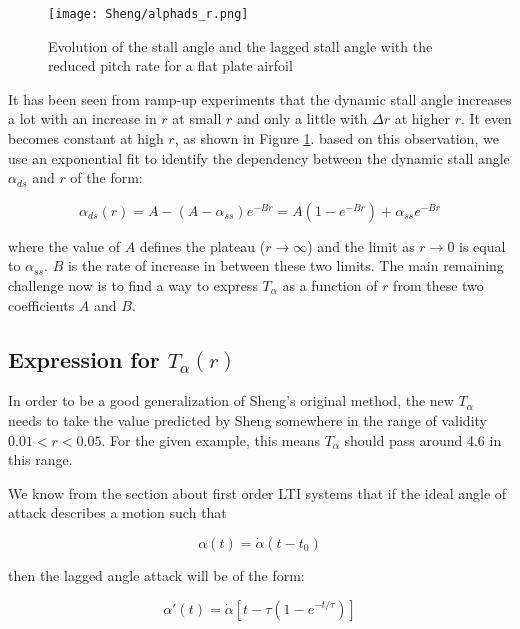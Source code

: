 \documentclass{article}
\newcommand{\alphadot}{\dot{\alpha}}
\begin{document}
\begin{figure}[h]
\centering
\texttt{[image: Sheng/alphads\_r.png]} 
\caption{Evolution of the stall angle and the lagged stall angle with the reduced pitch rate for a flat plate airfoil}
\label{fig:alphads_r}
\end{figure}

It has been seen from ramp-up experiments that the dynamic stall angle increases a lot with an increase in $r$ at small $r$ and only a little with $\Delta r$ at higher $r$. It even becomes constant at high $r$, as shown in Figure \ref{fig:alphads_r}. based on this observation, we use an exponential fit to identify the dependency between the dynamic stall angle $\alpha_{ds}$ and $r$ of the form: 

\begin{equation}
\alpha_{ds}(r) = A-(A-\alpha_{ss})e^{-Br} = A(1-e^{-Br})+\alpha_{ss}e^{-Br}
\label{eq:alpha_ds_r}
\end{equation}

\noindent where the value of $A$ defines the plateau ($r \rightarrow \infty$) and the limit as $r \rightarrow 0$ is equal to $\alpha_{ss}$. $B$ is the rate of increase in between these two limits. The main remaining challenge now is to find a way to express $T_\alpha$ as a function of $r$ from these two coefficients $A$ and $B$.

\subsection{Expression for $T_\alpha(r)$}

In order to be a good generalization of Sheng's original method, the new $T_\alpha$ needs to take the value predicted by Sheng somewhere in the range of validity $0.01<r<0.05$. For the given example, this means $T_\alpha$ should pass around  4.6 in this range. 

We know from the section about first order LTI systems that if the ideal angle of attack describes a motion such that 

\begin{equation}
\alpha(t) = \alphadot(t-t_0)
\end{equation}

\noindent then the lagged angle attack will be of the form:

\begin{equation}
\alpha'(t) = \alphadot\left[t- \tau(1-e^{-t/ \tau})\right]
\end{equation}
\end{document}
